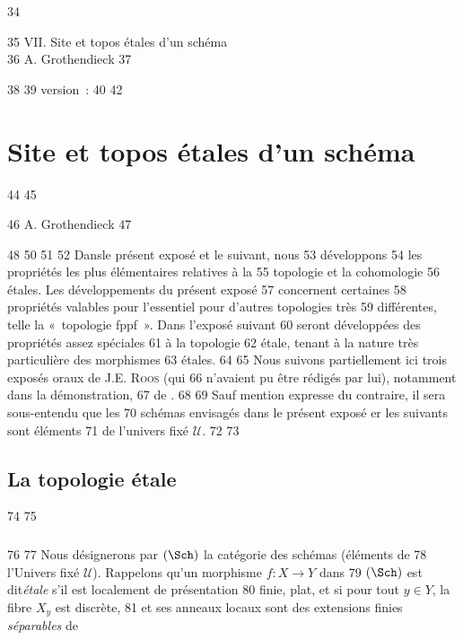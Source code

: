     34	\begin{center}
    35	VII. Site et topos étales d'un schéma\\
    36	A. Grothendieck
    37	\end{center}
    38	
    39	version : \showgitstatus{}
    40		
    42		\chapter{Site et topos étales d'un schéma}
    44	%
    45	\begin{center}
    46	A. Grothendieck
    47	\end{center}
    48		
    50	\setcounter{pageoriginal}{341}
    51	
    52	Dans\pageoriginale le présent exposé et le suivant, nous
    53	développons
    54	les propriétés les plus élémentaires relatives à la
    55	topologie et la cohomologie
    56	étales. Les développements du présent exposé
    57	concernent certaines
    58	propriétés valables pour l'essentiel pour d'autres topologies très
    59	différentes, telle la « topologie fppf ». Dans l'exposé suivant
    60	seront développées des propriétés assez spéciales
    61	à la topologie
    62	étale, tenant à la nature très particulière des morphismes
    63	étales.
    64	
    65	Nous suivons partiellement ici trois exposés oraux de J.E. \textsc{Roos} (qui
    66	n'avaient pu être rédigés par lui), notamment dans la démonstration,
    67	de .
    68	
    69	Sauf mention expresse du contraire, il sera sous-entendu que les
    70	schémas envisagés dans le présent exposé er les suivants sont éléments
    71	de l'univers fixé $𝒰$.
    72	
    73	\section{La topologie étale}
    74	
    75	\subsection{}
    76	
    77	Nous désignerons par $(\Sch)$ la catégorie des schémas (éléments de
    78	l'Univers fixé $𝒰$). Rappelons qu'un morphisme $f : X \to Y$ dans
    79	$(\Sch)$ est dit\pageoriginale \emph{étale} s'il est localement de présentation
    80	finie, plat, et si pour tout $y \in Y$, la fibre $X_y$ est discrète,
    81	et ses anneaux locaux sont des extensions finies \emph{séparables} de
